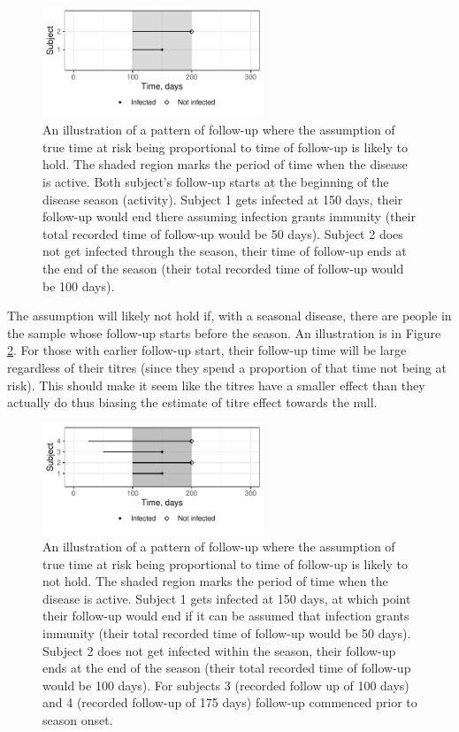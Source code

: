 \documentclass[12pt]{article}
\begin{document}
\begin{figure}[htp]
	\centering
	\includegraphics[width=0.59\textwidth]{../curve-cox/timeplot_3_light.pdf}
	\caption{
	An illustration of a pattern of follow-up where the assumption of true time at risk being proportional to time of follow-up is likely to hold. The shaded region marks the period of time when the disease is active. Both subject's follow-up starts at the beginning of the disease season (activity). Subject 1 gets infected at 150 days, their follow-up would end there assuming infection grants immunity (their total recorded time of follow-up would be 50 days). Subject 2 does not get infected through the season, their time of follow-up ends at the end of the season (their total recorded time of follow-up would be 100 days).
	}
	\label{CoxIdeal}
\end{figure}

The assumption will likely not hold if, with a seasonal disease, there are people in the sample whose follow-up starts before the season. An illustration is in Figure \ref{CoxNotIdeal}. For those with earlier follow-up start, their follow-up time will be large regardless of their titres (since they spend a proportion of that time not being at risk). This should make it seem like the titres have a smaller effect than they actually do thus biasing the estimate of titre effect towards the null.

\begin{figure}[htp]
	\centering
	\includegraphics[width=0.59\textwidth]{../curve-cox/timeplot_4_light.pdf}
	\caption{
	An illustration of a pattern of follow-up where the assumption of true time at risk being proportional to time of follow-up is likely to not hold. The shaded region marks the period of time when the disease is active. Subject 1 gets infected at 150 days, at which point their follow-up would end if it can be assumed that infection grants immunity (their total recorded time of follow-up would be 50 days). Subject 2 does not get infected within the season, their follow-up ends at the end of the season (their total recorded time of follow-up would be 100 days). For subjects 3 (recorded follow up of 100 days) and 4 (recorded follow-up of 175 days) follow-up commenced prior to season onset.
	}
	\label{CoxNotIdeal}
\end{figure}
\end{document}
